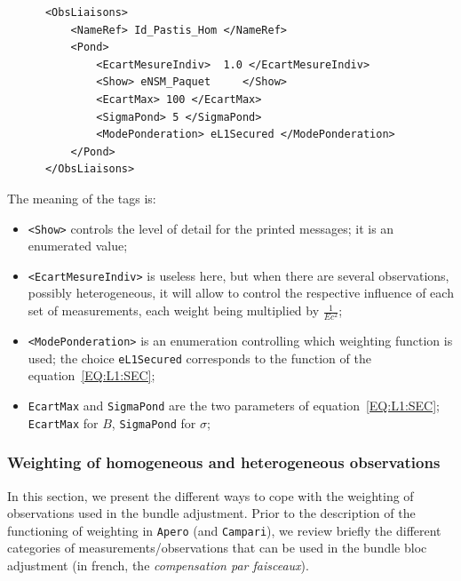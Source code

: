 {\scriptsize
\begin{verbatim}
      <ObsLiaisons>
          <NameRef> Id_Pastis_Hom </NameRef>
          <Pond>
              <EcartMesureIndiv>  1.0 </EcartMesureIndiv>
              <Show> eNSM_Paquet     </Show>
              <EcartMax> 100 </EcartMax>
              <SigmaPond> 5 </SigmaPond>
              <ModePonderation> eL1Secured </ModePonderation>
          </Pond>
      </ObsLiaisons>
\end{verbatim}
}

The meaning of the tags is:

\begin{itemize}
   \item  {\tt <Show>} controls the level of detail for the printed messages;
          it is an enumerated value;
   \item  {\tt <EcartMesureIndiv>} is useless here, but when there are several
          observations, possibly heterogeneous, it will allow to control the
          respective influence of each set of measurements, each weight being
          multiplied by $\frac1{Ec^2}$;
   \item  {\tt <ModePonderation>} is an enumeration controlling which weighting
          function is used; the choice {\tt eL1Secured} corresponds to the function
          of the equation~\ref{EQ:L1:SEC};
   \item  {\tt EcartMax} and {\tt SigmaPond} are the two parameters of equation~\ref{EQ:L1:SEC};
          {\tt EcartMax}  for $B$,  {\tt SigmaPond}  for $\sigma$;
\end{itemize}



\subsubsection{Weighting of homogeneous and heterogeneous observations}

In this section, we present the different ways to cope with the weighting of observations used in the bundle adjustment. Prior to the description of the functioning of weighting in {\tt Apero} (and {\tt Campari}), we review briefly the different categories of measurements/observations that can be used in the bundle bloc adjustment (in french, the {\it compensation par faisceaux}).

